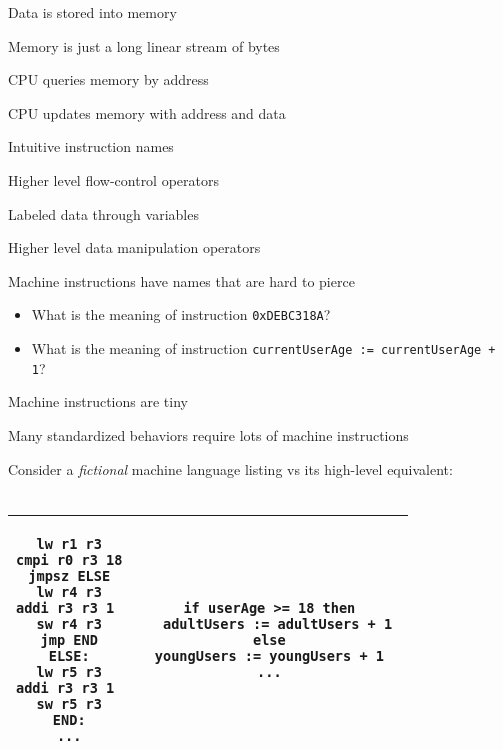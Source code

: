 \documentclass{beamer}
\begin{document}
\begin{slide}{
\item Data is stored into memory
\item Memory is just a long linear stream of bytes
\item CPU queries memory by address
\item CPU updates memory with address and data
}\end{slide}

\begin{slide}{
\item Intuitive instruction names
\item Higher level flow-control operators
\item Labeled data through variables
\item Higher level data manipulation operators
}\end{slide}

\begin{slide}{
\item Machine instructions have names that are hard to pierce
\pause
\begin{itemize}
\item What is the meaning of instruction \texttt{0xDEBC318A}?
\pause
\item What is the meaning of instruction \texttt{currentUserAge := currentUserAge + 1}?
\end{itemize}
}\end{slide}

\begin{slide}{
\item Machine instructions are tiny
\item Many standardized behaviors require lots of machine instructions
}\end{slide}

\begin{frame}[fragile]
Consider a \textit{fictional} machine language listing vs its high-level equivalent: \\ \ \\

\begin{tabular}{| c | c |}
\hline
\begin{lstlisting}
lw r1 r3
cmpi r0 r3 18
jmpsz ELSE
lw r4 r3
addi r3 r3 1 
sw r4 r3
jmp END
ELSE:
lw r5 r3
addi r3 r3 1 
sw r5 r3
END:
...
\end{lstlisting}

&

\begin{lstlisting}
if userAge >= 18 then
  adultUsers := adultUsers + 1
else
  youngUsers := youngUsers + 1  
...
\end{lstlisting}

\\
\hline
\end{tabular}
\end{frame}
\end{document}
